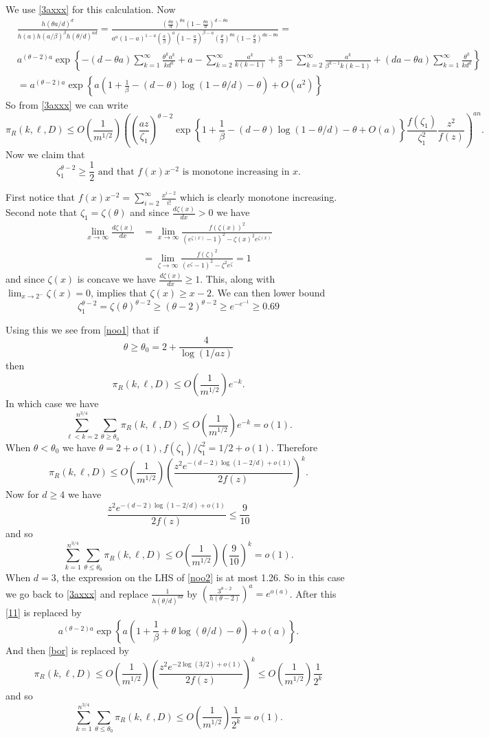 \documentclass[11pt]{article}
\def\b{\beta}
\def\z{\zeta}
\def\th{\theta}
\def\p{\pi}
\newcommand{\set}[1]{\left\{#1\right\}}
\newcommand{\brac}[1]{\left(#1\right)}
\newcommand{\bfrac}[2]{\brac{\frac{#1}{#2}}}
\newcommand{\beq}[1]{\begin{equation}\label{#1}}
\newcommand{\eeq}{\end{equation}}
\def\c{{3/4}}
\begin{document}
We use \eqref{3axxx} for this calculation. Now
\begin{align}
&\frac{h(\th a/d)^d}{h(a)h(a/\b)^\b h(\th/d)^{a d}}=
\frac{\bfrac{\th a}{d}^{\th a}\brac{1-\frac{\th a}{d}}^{d-\th a}}{a^a(1-a)^{1-a}\bfrac{a}{\b}^a\brac{1-\frac{a}{\b}}^{\b-a}
\bfrac{\th}{d}^{\th a}\brac{1-\frac{\th}{d}}^{da-\th a}}=\nonumber\\
&a^{(\th-2) a}\exp\set{-(d-\th a)\sum_{k=1}^\infty \frac{\th^ka^k}{kd^k}+a-\sum_{k=2}^\infty \frac{a^k}{k(k-1)}+
\frac{a}{\b}-\sum_{k=2}^\infty \frac{a^k}{\b^{k-1}k(k-1)}+
(da-\th a)\sum_{k=1}^\infty \frac{\th^k}{kd^k}}\nonumber\\
&=a^{(\th-2) a}\exp\set{a\brac{1+\frac{1}{\b}-(d-\th)\log(1-\th/d)-\th}+O(a^2)}\label{11}
\end{align}
So from \eqref{3axxx} we can write
\beq{noo1}
\p_R(k,\ell,D)\leq O\bfrac{1}{m^{1/2}}\brac{\bfrac{az}{\z_1}^{\th-2}\exp\set{1+\frac{1}{\b}-(d-\th)\log(1-\th/d)-\th+O(a)}
\frac{f(\z_1)}{\z_1^2} \frac{z^2}{f(z)}}^{a n}.
\eeq
Now we claim that 
\beq{zeta1}
\z_1^{\th-2}\geq \frac12\text{ and that }f(x)x^{-2}\text{ is monotone increasing in }x.
\eeq

First notice that $f(x)x^{-2} = \sum_{i=2}^\infty\frac{x^{i-2}}{i!}$
which is clearly monotone increasing. Second note that 
$\z_1 =\z(\th)$ and since $\frac{d\z(x)}{dx}>0$ we have
\begin{align*}
\lim_{x\to\infty}\frac{d\z(x)}{dx} &= \lim_{x\to\infty} \frac{f(\z(x))^2}{(e^{\z(x)}-1)^2-\z(x)^2e^{\z(x)}}\\
&= \lim_{\z\to\infty}\frac{f(\z)^2}{(e^\z-1)^2-\z^2e^\z} = 1
\end{align*}
and since $\z(x)$ is concave 
we have $\frac{d\z(x)}{dx}\ge 1$. This, along with $\lim_{x\to 2^{-}}\z(x) = 0$, implies that $\z(x)\ge x-2$. We can then lower bound
$$
\z_1^{\th-2} = \z(\th)^{\th-2}\ge (\th-2)^{\th-2} \ge e^{-e^{-1}}\ge 0.69
$$

Using this we see from
\eqref{noo1} that if
$$\th\geq \th_0=2+\frac{4}{\log (1/az) }$$
then
$$\p_R(k,\ell,D)\leq O\bfrac{1}{m^{1/2}}e^{-k}.$$
In which case we have
\beq{ps1}
\sum_{\ell<k=2}^{n^{\c}}\sum_{\th\geq \th_0}\p_R(k,\ell,D)\leq O\bfrac{1}{m^{1/2}}e^{-k}=o(1).
\eeq
When $\th<\th_0$ we have $\th=2+o(1),f(\z_1)/\z_1^2=1/2+o(1)$. Therefore
\beq{bor}
\p_R(k,\ell,D)\leq O\bfrac{1}{m^{1/2}}\bfrac{z^2e^{-(d-2)\log(1-2/d)+o(1)}}{2f(z)}^k.
\eeq
Now for $d\geq 4$ we have
\beq{noo2}
\frac{z^2e^{-(d-2)\log(1-2/d)+o(1)}}{2f(z)}\leq \frac{9}{10}
\eeq
and so
\beq{noo3}
\sum_{k=1}^{n^{\c}}\sum_{\th\leq \th_0}\p_R(k,\ell,D)\leq O\bfrac{1}{m^{1/2}}\bfrac{9}{10}^k=o(1).
\eeq
When $d=3$, the expression on the LHS of \eqref{noo2} is at most 1.26. So in this case we go back to 
\eqref{3axxx} and replace $\frac{1}{h(\th/d)^{ad}}$ by $\bfrac{3^{\th-2}}{h\brac{\th-2}}^a=e^{o(a)}$. After this
\eqref{11} is replaced by
$$a^{(\th-2) a}\exp\set{a\brac{1+\frac{1}{\b}+\th\log(\th/d)-\th}+o(a)}.$$
And then \eqref{bor} is replaced by
$$\p_R(k,\ell,D)\leq O\bfrac{1}{m^{1/2}}\bfrac{z^2e^{-2\log(3/2)+o(1)}}{2f(z)}^k\leq O\bfrac{1}{m^{1/2}}\frac{1}{2^k}$$
and so
\beq{noo4}
\sum_{k=1}^{n^{\c}}\sum_{\th\leq \th_0}\p_R(k,\ell,D)\leq O\bfrac{1}{m^{1/2}}\frac{1}{2^k}=o(1).
\eeq
\end{document}
